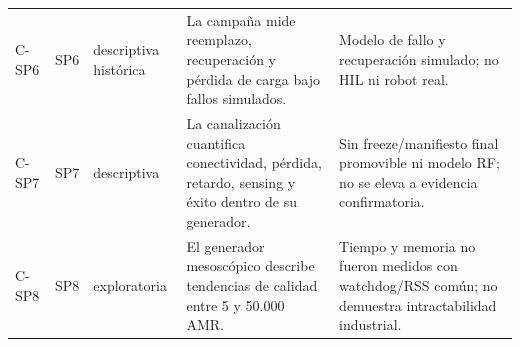\begin{landscape}
\begin{longtable}{p{1.2cm}p{1.5cm}p{3.5cm}p{7.8cm}p{6.7cm}}
C-SP6 & SP6 & descriptiva histórica & La campaña mide reemplazo, recuperación y pérdida de carga bajo fallos simulados. & Modelo de fallo y recuperación simulado; no HIL ni robot real. \\
C-SP7 & SP7 & descriptiva & La canalización cuantifica conectividad, pérdida, retardo, sensing y éxito dentro de su generador. & Sin freeze/manifiesto final promovible ni modelo RF; no se eleva a evidencia confirmatoria. \\
C-SP8 & SP8 & exploratoria & El generador mesoscópico describe tendencias de calidad entre 5 y 50.000 AMR. & Tiempo y memoria no fueron medidos con watchdog/RSS común; no demuestra intractabilidad industrial. \\
\bottomrule
\end{longtable}
\end{landscape}
